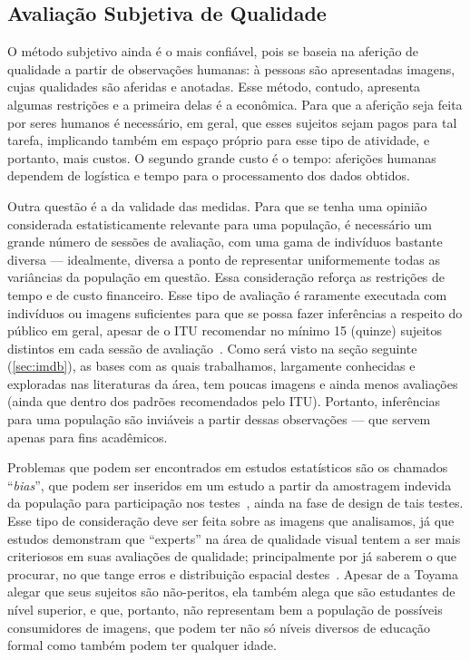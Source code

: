 \subsection{Avaliação Subjetiva de Qualidade}\label{sec:avSub}

	O método subjetivo ainda é o mais confiável, pois se baseia na aferição de qualidade a partir de observações humanas: à pessoas são apresentadas imagens, cujas qualidades são aferidas e anotadas. Esse método, contudo, apresenta algumas restrições e a primeira delas é a econômica. Para que a aferição seja feita por seres humanos é necessário, em geral, que esses sujeitos sejam pagos para tal tarefa, implicando também em espaço próprio para esse tipo de atividade, e portanto, mais custos. O segundo grande custo é o tempo: aferições humanas dependem de logística e tempo para o processamento dos dados obtidos.

	Outra questão é a da validade das medidas. Para que se tenha uma opinião considerada estatisticamente relevante para uma população, é necessário um grande número de sessões de avaliação, com uma gama de indivíduos bastante diversa --- idealmente, diversa a ponto de representar uniformemente todas as variâncias da população em questão. Essa consideração reforça as restrições de tempo e de custo financeiro. Esse tipo de avaliação é raramente executada com indivíduos ou imagens suficientes para que se possa fazer inferências a respeito do público em geral, apesar de o ITU recomendar no mínimo 15 (quinze) sujeitos distintos em cada sessão de avaliação~\cite[p.08]{itur2012}. Como será visto na seção seguinte (\autoref{sec:imdb}), as bases com as quais trabalhamos, largamente conhecidas e exploradas nas literaturas da área, tem poucas imagens e ainda menos avaliações (ainda que dentro dos padrões recomendados pelo ITU). Portanto, inferências para uma população são inviáveis a partir dessas observações --- que servem apenas para fins acadêmicos.

Problemas que podem ser encontrados em estudos estatísticos são os chamados ``\emph{bias}'', que podem ser inseridos em um estudo a partir da amostragem indevida da população para participação nos testes~\cite{boslaugh2008}, ainda na fase de design de tais testes. Esse tipo de consideração deve ser feita sobre as imagens que analisamos, já que estudos demonstram que ``experts'' na área de qualidade visual tentem a ser mais criteriosos em suas avaliações de qualidade; principalmente por já saberem o que procurar, no que tange erros e distribuição espacial destes~\cite[p.08]{itur2012}. Apesar de a Toyama alegar que seus sujeitos são não-peritos, ela também alega que são estudantes de nível superior, e que, portanto, não representam bem a população de possíveis consumidores de imagens, que podem ter não só níveis diversos de educação formal como também podem ter qualquer idade.

